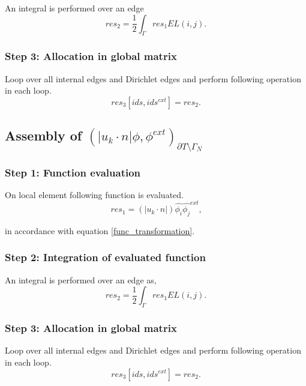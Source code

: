 \documentclass[a4paper,twoside,openright]{book}
\begin{document}
An integral is performed over an edge
\begin{equation}
res_2 = \frac{1}{2} \int_{\Gamma} res_1 EL(i,j) \textrm{.}
\end{equation}

\subsubsection{Step 3: Allocation in global matrix}

Loop over all internal edges and Dirichlet edges and perform following operation in each loop.
\begin{equation}
res_3[ids,ids^{ext}] = res_2 \textrm{.}
\end{equation}

\subsection{Assembly of $(|u_k \cdot n| \phi,\phi^{ext})_{\partial T \setminus \Gamma_N}$} 

\subsubsection{Step 1: Function evaluation}

On local element following function is evaluated.
\begin{equation}
res_1 = (|u_k \cdot n|) \hat{\phi_i} \hat{\phi_j}^{ext} \textrm{,}
\end{equation}

in accordance with equation \eqref{func_transformation}.\\

\subsubsection{Step 2: Integration of evaluated function}

An integral is performed over an edge as,
\begin{equation}
res_2 = \frac{1}{2} \int_{\Gamma} res_1 EL(i,j) \textrm{.}
\end{equation}

\subsubsection{Step 3: Allocation in global matrix}

Loop over all internal edges and Dirichlet edges and perform following operation in each loop.
\begin{equation}
res_3[ids,ids^{ext}] = res_2 \textrm{.}
\end{equation}
\end{document}
